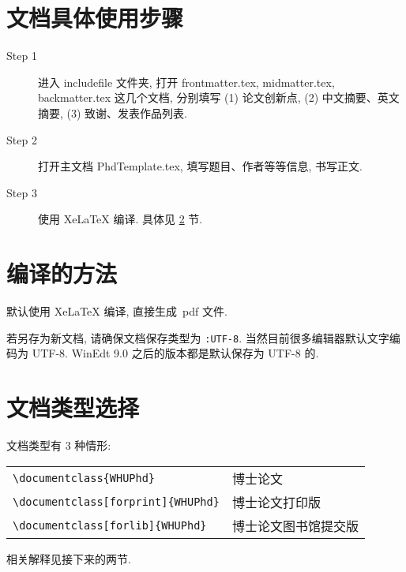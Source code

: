 \documentclass{ice_report}  %
\begin{document}
\section{文档具体使用步骤}

\begin{description}
  \item[Step 1]  进入 includefile 文件夹,  打开 frontmatter.tex,  midmatter.tex,  backmatter.tex 这几个文档,
        分别填写 (1) 论文创新点, (2) 中文摘要、英文摘要, (3) 致谢、发表作品列表.

  \item[Step 2]  打开主文档 PhdTemplate.tex, 填写题目、作者等等信息, 书写正文.

  \item[Step 3]  使用 XeLaTeX{} 编译. 具体见 \ref{sec-compile} 节.

\end{description}


\section{编译的方法}\label{sec-compile}

默认使用 XeLaTeX 编译, 直接生成~pdf 文件.

若另存为新文档, 请确保文档保存类型为 \verb|:UTF-8|. 当然目前很多编辑器默认文字编码为 UTF-8.
WinEdt 9.0 之后的版本都是默认保存为 UTF-8 的.




\section{文档类型选择}
文档类型有 3 种情形:

\begin{table}[ht]\centering
\begin{tabular}{ll}
\hline
   \verb|\documentclass{WHUPhd}|                   &  博士论文 \\
   \verb|\documentclass[forprint]{WHUPhd}|        &  博士论文打印版 \\
   \verb|\documentclass[forlib]{WHUPhd}|           &  博士论文图书馆提交版 \\
\hline
\end{tabular}
\end{table}
相关解释见接下来的两节.
\end{document}
